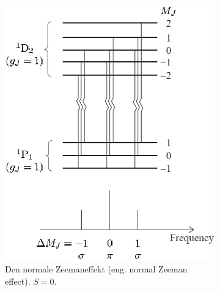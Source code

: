 \begin{figure}[!h]
    \centering
    \begin{subfigure}[t]{0.46\textwidth}
        \centering
        \includegraphics[width=\columnwidth]{Q15/images/NormalZeemanEffect.PNG}
        \caption{Den normale Zeemaneffekt (eng. normal Zeeman effect). $S = 0$.}
        \label{fig:Q15_NormalZeemanEffect}
    \end{subfigure}
    \hfill
    \begin{subfigure}[t]{0.46\textwidth}
        \centering

\end{subfigure}
\end{figure}
